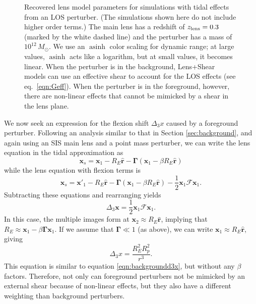 \documentclass{emulateapj}
\newcommand\GammaMat[0]{\boldsymbol{\Gamma}}
\newcommand\x[0]{\mathbf{x}}
\renewcommand\vec[1]{\mathbf{#1}}
\newcommand\asinh[0]{\operatorname{asinh}}
\newcommand\rhat[0]{\vec{\hat{r}}}
\newcommand\sF{{\mathcal F}}
\begin{document}
\begin{figure}[t]
\begin{center}
\caption{\label{fig:frontback} Recovered lens model parameters for simulations with tidal effects from an LOS perturber.  (The simulations shown here do not include higher order terms.)  The main lens has a redshift of $z_{\rm{lens}} = 0.3$ (marked by the white dashed line) and the perturber has a mass of $10^{12}\, M_\odot$.  We use an $\asinh$ color scaling for dynamic range; at large values, $\asinh$ acts like a logarithm, but at small values, it becomes linear.  When the perturber is in the background, Lens+Shear models can use an effective shear to account for the LOS effects (see eq.\ \ref{eqn:Geff}).  When the perturber is in the foreground, however, there are non-linear effects that cannot be mimicked by a shear in the lens plane.
}
\end{center}
\end{figure}

We now seek an expression for the flexion shift $\Delta_3 x$ caused by a foreground perturber.  Following an analysis similar to that in Section \ref{sec:background}, and again using an SIS main lens and a point mass perturber, we can write the lens equation in the tidal approximation as
\begin{equation}
\x_s = \x_1 - R_E \rhat - \GammaMat(\x_1 - \beta R_E \rhat) 
\end{equation}
while the lens equation with flexion terms is
\begin{equation}
\x_s = \x'_1 - R_E \rhat - \GammaMat(\x_1 - \beta R_E \rhat) - \frac{1}{2} \x_1 \sF \x_1.
\end{equation}
Subtracting these equations and rearranging yields
\begin{equation}
\Delta_3 \x = \frac{1}{2} \x_1 \sF \x_1.
\end{equation}
In this case, the multiple images form at $\x_2 \approx R_E \rhat$, implying that $R_E \approx \x_1 - \beta \GammaMat \x_1$. If we assume that $\GammaMat \ll 1$ (as above), we can write $\x_1 \approx R_E \rhat$, giving
\begin{equation}
\Delta_3 x = \frac{R_E^2 R_p^2}{r^3}.
\label{eqn:foregroundd3x}
\end{equation}
This equation is similar to equation \ref{eqn:backgroundd3x}, but without any $\beta$ factors. Therefore, not only can foreground perturbers not be mimicked by an external shear because of non-linear effects, but they also have a different weighting than background perturbers.
\end{document}
